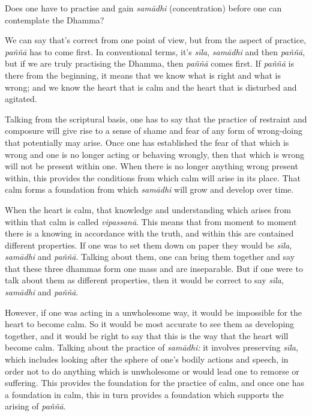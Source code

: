 
\question{}
Does one have to practise and gain \emph{samādhi} (concentration) before one
can contemplate the Dhamma?

We can say that's correct from one point of view,
but from the aspect of practice, \emph{paññā} has to come first. In
conventional terms, it's \emph{sīla}, \emph{samādhi} and then
\emph{paññā}, but if we are truly practising the Dhamma, then
\emph{paññā} comes first. If \emph{paññā} is there from the beginning, 
it means that we know what is right and what is wrong; and we know the
heart that is calm and the heart that is disturbed and agitated. 

Talking from the scriptural basis, one has to say that the practice of
restraint and composure will give rise to a sense of shame and fear of
any form of wrong-doing that potentially may arise. Once one has
established the fear of that which is wrong and one is no longer acting
or behaving wrongly, then that which is wrong will not be present within
one. When there is no longer anything wrong present within, this
provides the conditions from which calm will arise in its place. That
calm forms a foundation from which \emph{samādhi} will grow and develop over
time. 

When the heart is calm, that knowledge and understanding which arises
from within that calm is called \emph{vipassanā}. This means that from
moment to moment there is a knowing in accordance with the truth, and
within this are contained different properties. If one was to set them
down on paper they would be \emph{sīla}, \emph{samādhi} and
\emph{paññā}. Talking about them, one can bring them together and say
that these three dhammas form one mass and are inseparable. But if one
were to talk about them as different properties, then it would be
correct to say \emph{sīla}, \emph{samādhi} and \emph{paññā}. 

However, if one was acting in a unwholesome way, it would be impossible
for the heart to become calm. So it would be most accurate to see them
as developing together, and it would be right to say that this is the
way that the heart will become calm. Talking about the practice of
\emph{samādhi:} it involves preserving \emph{sīla}, which includes
looking after the sphere of one's bodily actions and speech, in order
not to do anything which is unwholesome or would lead one to remorse or
suffering. This provides the foundation for the practice of calm, and
once one has a foundation in calm, this in turn provides a foundation
which supports the arising of \emph{paññā}. 

